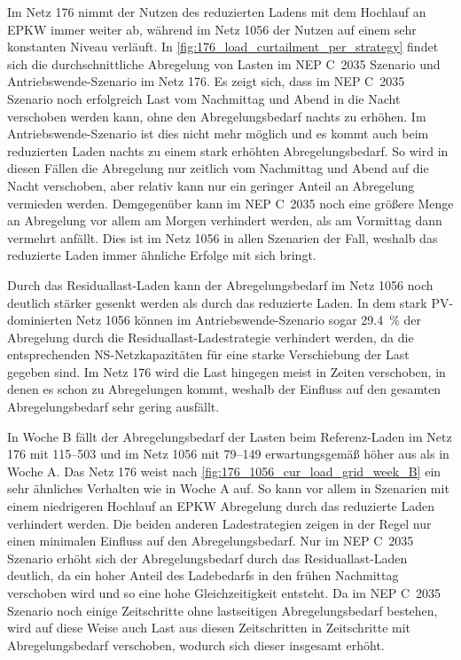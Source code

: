 Im Netz \num{176} nimmt der Nutzen des reduzierten Ladens mit dem Hochlauf an \gls{EPKW} immer weiter ab, während im Netz \num{1056} der Nutzen auf einem sehr konstanten Niveau verläuft.
In \autoref{fig:176_load_curtailment_per_strategy} findet sich die durchschnittliche Abregelung von Lasten im NEP C~\num{2035} Szenario und Antriebswende-Szenario im Netz \num{176}.
Es zeigt sich, dass im NEP C~\num{2035} Szenario noch erfolgreich Last vom Nachmittag und Abend in die Nacht verschoben werden kann, ohne den Abregelungsbedarf nachts zu erhöhen.
Im Antriebswende-Szenario ist dies nicht mehr möglich und es kommt auch beim reduzierten Laden nachts zu einem stark erhöhten Abregelungsbedarf.
So wird in diesen Fällen die Abregelung nur zeitlich vom Nachmittag und Abend auf die Nacht verschoben, aber relativ kann nur ein geringer Anteil an Abregelung vermieden werden.
Demgegenüber kann im NEP C~\num{2035} noch eine größere Menge an Abregelung vor allem am Morgen verhindert werden, als am Vormittag dann vermehrt anfällt.
Dies ist im Netz \num{1056} in allen Szenarien der Fall, weshalb das reduzierte Laden immer ähnliche Erfolge mit sich bringt.\medskip

Durch das Residuallast-Laden kann der Abregelungsbedarf im Netz \num{1056} noch deutlich stärker gesenkt werden als durch das reduzierte Laden.
In dem stark \gls{PV}-dominierten Netz \num{1056} können im Antriebswende-Szenario sogar \SI{29.4}{\percent} der Abregelung durch die Residuallast-Ladestrategie verhindert werden, da die entsprechenden \gls{NS}-Netzkapazitäten für eine starke Verschiebung der Last gegeben sind.
Im Netz \num{176} wird die Last hingegen meist in Zeiten verschoben, in denen es schon zu Abregelungen kommt, weshalb der Einfluss auf den gesamten Abregelungsbedarf sehr gering ausfällt.



In Woche B fällt der Abregelungsbedarf der Lasten beim Referenz-Laden im Netz \num{176} mit \SIrange{115}{503}{\mwh} und im Netz \num{1056} mit \SIrange{79}{149}{\mwh} erwartungsgemäß höher aus als in Woche A.
Das Netz \num{176} weist nach \autoref{fig:176_1056_cur_load_grid_week_B} ein sehr ähnliches Verhalten wie in Woche A auf.
So kann vor allem in Szenarien mit einem niedrigeren Hochlauf an \gls{EPKW} Abregelung durch das reduzierte Laden verhindert werden.
Die beiden anderen Ladestrategien zeigen in der Regel nur einen minimalen Einfluss auf den Abregelungsbedarf.
Nur im NEP C~\num{2035} Szenario erhöht sich der Abregelungsbedarf durch das Residuallast-Laden deutlich, da ein hoher Anteil des Ladebedarfs in den frühen Nachmittag verschoben wird und so eine hohe Gleichzeitigkeit entsteht.
Da im NEP C~\num{2035} Szenario noch einige Zeitschritte ohne lastseitigen Abregelungsbedarf bestehen, wird auf diese Weise auch Last aus diesen Zeitschritten in Zeitschritte mit Abregelungsbedarf verschoben, wodurch sich dieser insgesamt erhöht.\medskip

